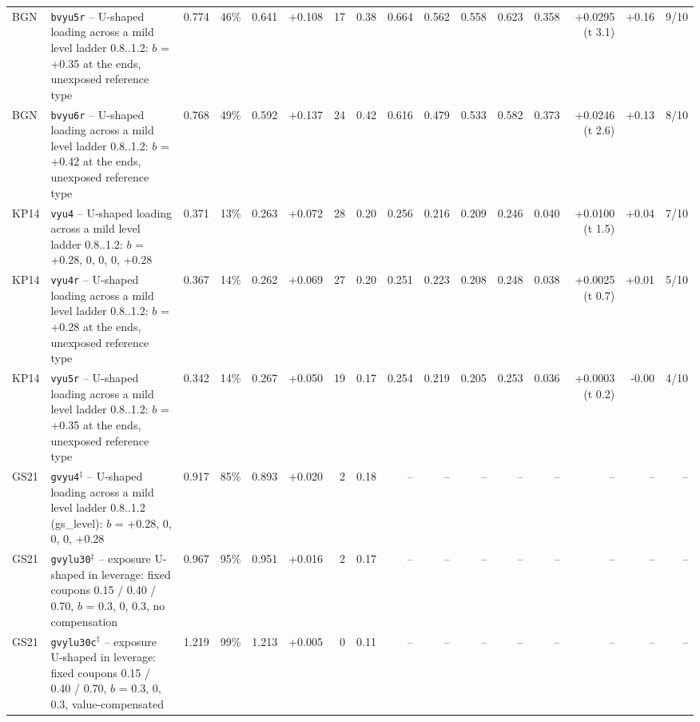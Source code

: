 \begin{table}[htbp]
{\begin{tabular}{llrrrrrrrrrrrrrr}
BGN & \texttt{bvyu5r} -- U-shaped loading across a mild level ladder 0.8..1.2: $b$ = +0.35 at the ends, unexposed reference type & 0.774 & 46\% & 0.641 & +0.108 & 17 & 0.38 & 0.664 & 0.562 & 0.558 & 0.623 & 0.358 & +0.0295 (t 3.1) & +0.16 & 9/10 \\
BGN & \texttt{bvyu6r} -- U-shaped loading across a mild level ladder 0.8..1.2: $b$ = +0.42 at the ends, unexposed reference type & 0.768 & 49\% & 0.592 & +0.137 & 24 & 0.42 & 0.616 & 0.479 & 0.533 & 0.582 & 0.373 & +0.0246 (t 2.6) & +0.13 & 8/10 \\
KP14 & \texttt{vyu4} -- U-shaped loading across a mild level ladder 0.8..1.2: $b$ = +0.28, 0, 0, 0, +0.28 & 0.371 & 13\% & 0.263 & +0.072 & 28 & 0.20 & 0.256 & 0.216 & 0.209 & 0.246 & 0.040 & +0.0100 (t 1.5) & +0.04 & 7/10 \\
KP14 & \texttt{vyu4r} -- U-shaped loading across a mild level ladder 0.8..1.2: $b$ = +0.28 at the ends, unexposed reference type & 0.367 & 14\% & 0.262 & +0.069 & 27 & 0.20 & 0.251 & 0.223 & 0.208 & 0.248 & 0.038 & +0.0025 (t 0.7) & +0.01 & 5/10 \\
KP14 & \texttt{vyu5r} -- U-shaped loading across a mild level ladder 0.8..1.2: $b$ = +0.35 at the ends, unexposed reference type & 0.342 & 14\% & 0.267 & +0.050 & 19 & 0.17 & 0.254 & 0.219 & 0.205 & 0.253 & 0.036 & +0.0003 (t 0.2) & -0.00 & 4/10 \\
GS21 & \texttt{gvyu4}$^\ddagger$ -- U-shaped loading across a mild level ladder 0.8..1.2 (gs\_level): $b$ = +0.28, 0, 0, 0, +0.28 & 0.917 & 85\% & 0.893 & +0.020 & 2 & 0.18 & -- & -- & -- & -- & -- & -- & -- & -- \\
GS21 & \texttt{gvylu30}$^\ddagger$ -- exposure U-shaped in leverage: fixed coupons 0.15 / 0.40 / 0.70, $b$ = 0.3, 0, 0.3, no compensation & 0.967 & 95\% & 0.951 & +0.016 & 2 & 0.17 & -- & -- & -- & -- & -- & -- & -- & -- \\
GS21 & \texttt{gvylu30c}$^\ddagger$ -- exposure U-shaped in leverage: fixed coupons 0.15 / 0.40 / 0.70, $b$ = 0.3, 0, 0.3, value-compensated & 1.219 & 99\% & 1.213 & +0.005 & 0 & 0.11 & -- & -- & -- & -- & -- & -- & -- & -- \\
\hline\end{tabular}}\end{table}
